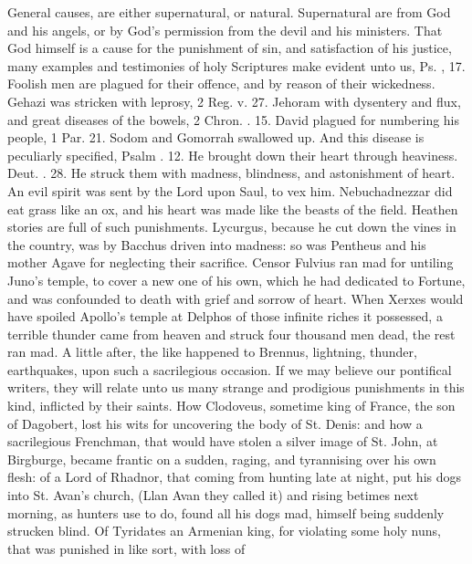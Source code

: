 {{General causes, are either supernatural, or natural. Supernatural are
from God and his angels, or by God's permission from the devil and his
ministers. That God himself is a cause for the punishment of sin, and
satisfaction of his justice, many examples and testimonies of holy
Scriptures make evident unto us, Ps. , 17. Foolish men are plagued
for their offence, and by reason of their wickedness. Gehazi was
stricken with leprosy, 2 Reg. v. 27. Jehoram with dysentery and flux,
and great diseases of the bowels, 2 Chron. . 15. David plagued for
numbering his people, 1 Par. 21. Sodom and Gomorrah swallowed up. And
this disease is peculiarly specified, Psalm . 12. He brought down
their heart through heaviness. Deut. . 28. He struck them with
madness, blindness, and astonishment of heart. An evil spirit was
sent by the Lord upon Saul, to vex him. Nebuchadnezzar did eat
grass like an ox, and his heart was made like the beasts of the field.
Heathen stories are full of such punishments. Lycurgus, because he cut
down the vines in the country, was by Bacchus driven into madness: so
was Pentheus and his mother Agave for neglecting their sacrifice.
Censor Fulvius ran mad for untiling Juno's temple, to cover a new
one of his own, which he had dedicated to Fortune, and was
confounded to death with grief and sorrow of heart. When Xerxes would
have spoiled Apollo's temple at Delphos of those infinite riches
it possessed, a terrible thunder came from heaven and struck four
thousand men dead, the rest ran mad. A little after, the like
happened to Brennus, lightning, thunder, earthquakes, upon such a
sacrilegious occasion. If we may believe our pontifical writers, they
will relate unto us many strange and prodigious punishments in this
kind, inflicted by their saints. How Clodoveus, sometime king of
France, the son of Dagobert, lost his wits for uncovering the body of
St. Denis: and how a sacrilegious Frenchman, that would have
stolen a silver image of St. John, at Birgburge, became frantic on a
sudden, raging, and tyrannising over his own flesh: of a Lord of
Rhadnor, that coming from hunting late at night, put his dogs into St.
Avan's church, (Llan Avan they called it) and rising betimes next
morning, as hunters use to do, found all his dogs mad, himself being
suddenly strucken blind. Of Tyridates an Armenian king, for
violating some holy nuns, that was punished in like sort, with loss of
}}
